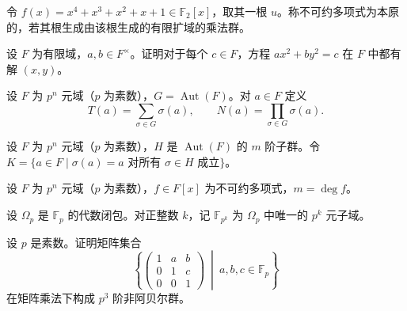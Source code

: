 \noindent\begin{minipage}{\textwidth}
令 $f(x)=x^4+x^3+x^2+x+1\in\mathbb{F}_2[x]$，取其一根 $u$。称不可约多项式为本原的，若其根生成由该根生成的有限扩域的乘法群。
\end{minipage}\par\vfill
\noindent\begin{minipage}{\textwidth}
设 $F$ 为有限域，$a,b\in F^\times$。证明对于每个 $c\in F$，方程 $ax^2+by^2=c$ 在 $F$ 中都有解 $(x,y)$。
\end{minipage}\par\vfill
\newpage
\noindent\begin{minipage}{\textwidth}
设 $F$ 为 $p^n$ 元域（$p$ 为素数），$G=\operatorname{Aut}(F)$。对 $a\in F$ 定义
\[
T(a)=\sum_{\sigma\in G}\sigma(a),\qquad N(a)=\prod_{\sigma\in G}\sigma(a).
\]
\end{minipage}\par\vfill
\noindent\begin{minipage}{\textwidth}
设 $F$ 为 $p^n$ 元域（$p$ 为素数），$H$ 是 $\operatorname{Aut}(F)$ 的 $m$ 阶子群。令 $K=\{a\in F\mid \sigma(a)=a\text{ 对所有 }\sigma\in H\text{ 成立}\}$。
\end{minipage}\par\vfill
\noindent\begin{minipage}{\textwidth}
设 $F$ 为 $p^n$ 元域（$p$ 为素数），$f\in F[x]$ 为不可约多项式，$m=\deg f$。
\end{minipage}\par\vfill
\newpage
\noindent\begin{minipage}{\textwidth}
设 $\Omega_p$ 是 $\mathbb{F}_p$ 的代数闭包。对正整数 $k$，记 $\mathbb{F}_{p^k}$ 为 $\Omega_p$ 中唯一的 $p^k$ 元子域。
\end{minipage}\par\vfill
\noindent\begin{minipage}{\textwidth}
设 $p$ 是素数。证明矩阵集合
\[
\left\{\begin{pmatrix}1&a&b\\0&1&c\\0&0&1\end{pmatrix}\ \middle|\ a,b,c\in\mathbb{F}_p\right\}
\]
在矩阵乘法下构成 $p^3$ 阶非阿贝尔群。
\end{minipage}\par\vfill
